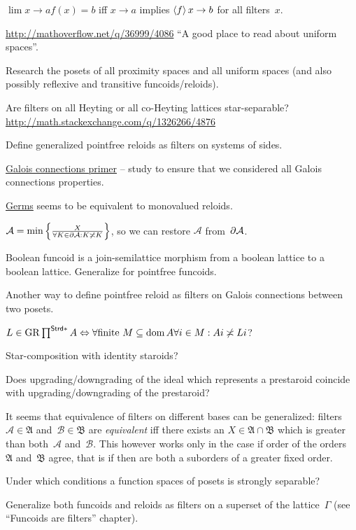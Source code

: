 \documentclass{amsart}
\begin{document}
$\lim {x\rightarrow a} f(x) = b$ iff $x\rightarrow a$ implies $\left\langle f\right\rangle x\rightarrow b$ for all filters~$x$.

\url{http://mathoverflow.net/q/36999/4086} ``A good place to read about uniform spaces''.

Research the posets of all proximity spaces and all uniform spaces (and also possibly reflexive and transitive funcoids/reloids).

Are filters on all Heyting or all co-Heyting lattices star-separable?
\url{http://math.stackexchange.com/q/1326266/4876}

Define generalized pointfree reloids as filters on systems of sides.

\href{https://www.math.ksu.edu/~strecker/primer.ps}{Galois connections primer} -- study to ensure that we considered all Galois connections properties.

\href{https://en.wikipedia.org/wiki/Germ (mathematics)}{Germs} seems to be equivalent to monovalued reloids.

$\mathcal{A} = \min\left\{ \frac{X}{\forall K\in\partial\mathcal{A}:K\not\asymp K}\right\}$, so we can restore $\mathcal{A}$ from~$\partial\mathcal{A}$.

Boolean funcoid is a join-semilattice morphism from a boolean lattice to a boolean lattice. Generalize for pointfree funcoids.

Another way to define pointfree reloid as filters on Galois connections between two posets.

$L \in \operatorname{GR} \prod^{\mathsf{Strd} \ast} A \Leftrightarrow \forall
\text{finite } M \subseteq \operatorname{dom} A \forall i \in M : A i \not\asymp L i$?

Star-composition with identity staroids?

Does upgrading/downgrading of the ideal which represents a prestaroid coincide with upgrading/downgrading of the prestaroid?

It seems that equivalence of filters on different bases can be generalized:
filters~$\mathcal{A}\in\mathfrak{A}$ and~$\mathcal{B}\in\mathfrak{B}$ are \emph{equivalent} iff
there exists an $X\in\mathfrak{A}\cap\mathfrak{B}$ which is greater than both~$\mathcal{A}$ and~$\mathcal{B}$.
This however works only in the case if order of the orders~$\mathfrak{A}$ and~$\mathfrak{B}$ agree,
that is if then are both a suborders of a greater fixed order.

Under which conditions a function spaces of posets is strongly separable?

Generalize both funcoids and reloids as filters on a superset of the lattice~$\Gamma$ (see ``Funcoids are filters'' chapter).
\end{document}
